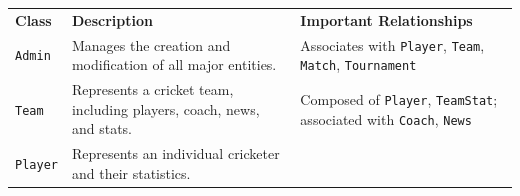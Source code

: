 \begin{center}
{\def\LTcaptype{none} %
\begin{longtable}[]{@{}
>{\raggedright\arraybackslash} p{}
>{\raggedright\arraybackslash} p{}
>{\raggedright\arraybackslash} p{}@{}}
\toprule\noalign{}
\endhead
\bottomrule\noalign{}
\endlastfoot
\begin{minipage}[t]{\linewidth}\raggedright
\textbf{Class}
\end{minipage} & \begin{minipage}[t]{\linewidth}\raggedright
\textbf{Description}
\end{minipage} & \begin{minipage}[t]{\linewidth}\raggedright
\textbf{Important Relationships}
\end{minipage} \\
\begin{minipage}[t]{\linewidth}\raggedright
\texttt{Admin}
\end{minipage} & \begin{minipage}[t]{\linewidth}\raggedright
Manages the creation and modification of all major entities.
\end{minipage} & \begin{minipage}[t]{\linewidth}\raggedright
Associates with \texttt{Player}, \texttt{Team}, \texttt{Match}, \texttt{Tournament}
\end{minipage} \\
\begin{minipage}[t]{\linewidth}\raggedright
\texttt{Team}
\end{minipage} & \begin{minipage}[t]{\linewidth}\raggedright
Represents a cricket team, including players, coach, news, and stats.
\end{minipage} & \begin{minipage}[t]{\linewidth}\raggedright
Composed of \texttt{Player}, \texttt{TeamStat}; associated with \texttt{Coach}, \texttt{News}
\end{minipage} \\
\begin{minipage}[t]{\linewidth}\raggedright
\texttt{Player}
\end{minipage} & \begin{minipage}[t]{\linewidth}\raggedright
Represents an individual cricketer and their statistics.
\end{minipage} & \begin{minipage}[t]{\linewidth}\raggedright

\end{minipage}
\end{longtable}}
\end{center}
